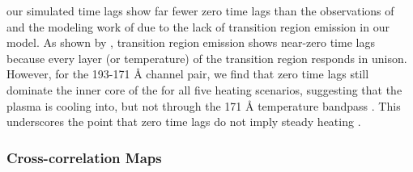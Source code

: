  our simulated time lags show far fewer zero time lags than the observations of \citet{viall_evidence_2012,viall_survey_2017} and the modeling work of \citet{bradshaw_patterns_2016} due to the lack of transition region emission in our model. As shown by \citet{viall_transition_2015}, transition region emission shows near-zero time lags because every layer (or temperature) of the transition region responds in unison. However, for the 193-171 \AA{} channel pair, we find that zero time lags still dominate the inner core of the \AR{} for all five heating scenarios, suggesting that the plasma is cooling into, but not through the 171 \AA{} temperature bandpass \citep{viall_survey_2017}. This underscores the point that zero time lags do not imply steady heating \citep{viall_transition_2015,viall_signatures_2016}.

\subsubsection{Cross-correlation Maps}\label{cross_correlation_maps}

